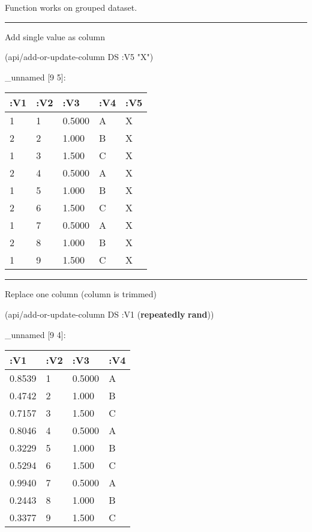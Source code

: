 \documentclass[]{article}
\newenvironment{Shaded}{\begin{snugshade}}{\end{snugshade}}
\newcommand{\KeywordTok}[1]{\textcolor[rgb]{0.13,0.29,0.53}{\textbf{#1}}}
\newcommand{\StringTok}[1]{\textcolor[rgb]{0.31,0.60,0.02}{#1}}
\newcommand{\AttributeTok}[1]{\textcolor[rgb]{0.77,0.63,0.00}{#1}}
\newcommand{\NormalTok}[1]{#1}
\begin{document}
Function works on grouped dataset.

\begin{center}\rule{0.5\linewidth}{0.5pt}\end{center}

Add single value as column

\begin{Shaded}
\begin{Highlighting}[]
\NormalTok{(api/add-or-update-column DS }\AttributeTok{:V5} \StringTok{"X"}\NormalTok{)}
\end{Highlighting}
\end{Shaded}

\_unnamed {[}9 5{]}:

\begin{longtable}[]{@{}lllll@{}}
\toprule
:V1 & :V2 & :V3 & :V4 & :V5\tabularnewline
\midrule
\endhead
1 & 1 & 0.5000 & A & X\tabularnewline
2 & 2 & 1.000 & B & X\tabularnewline
1 & 3 & 1.500 & C & X\tabularnewline
2 & 4 & 0.5000 & A & X\tabularnewline
1 & 5 & 1.000 & B & X\tabularnewline
2 & 6 & 1.500 & C & X\tabularnewline
1 & 7 & 0.5000 & A & X\tabularnewline
2 & 8 & 1.000 & B & X\tabularnewline
1 & 9 & 1.500 & C & X\tabularnewline
\bottomrule
\end{longtable}

\begin{center}\rule{0.5\linewidth}{0.5pt}\end{center}

Replace one column (column is trimmed)

\begin{Shaded}
\begin{Highlighting}[]
\NormalTok{(api/add-or-update-column DS }\AttributeTok{:V1}\NormalTok{ (}\KeywordTok{repeatedly} \KeywordTok{rand}\NormalTok{))}
\end{Highlighting}
\end{Shaded}

\_unnamed {[}9 4{]}:

\begin{longtable}[]{@{}llll@{}}
\toprule
:V1 & :V2 & :V3 & :V4\tabularnewline
\midrule
\endhead
0.8539 & 1 & 0.5000 & A\tabularnewline
0.4742 & 2 & 1.000 & B\tabularnewline
0.7157 & 3 & 1.500 & C\tabularnewline
0.8046 & 4 & 0.5000 & A\tabularnewline
0.3229 & 5 & 1.000 & B\tabularnewline
0.5294 & 6 & 1.500 & C\tabularnewline
0.9940 & 7 & 0.5000 & A\tabularnewline
0.2443 & 8 & 1.000 & B\tabularnewline
0.3377 & 9 & 1.500 & C\tabularnewline
\bottomrule
\end{longtable}
\end{document}
